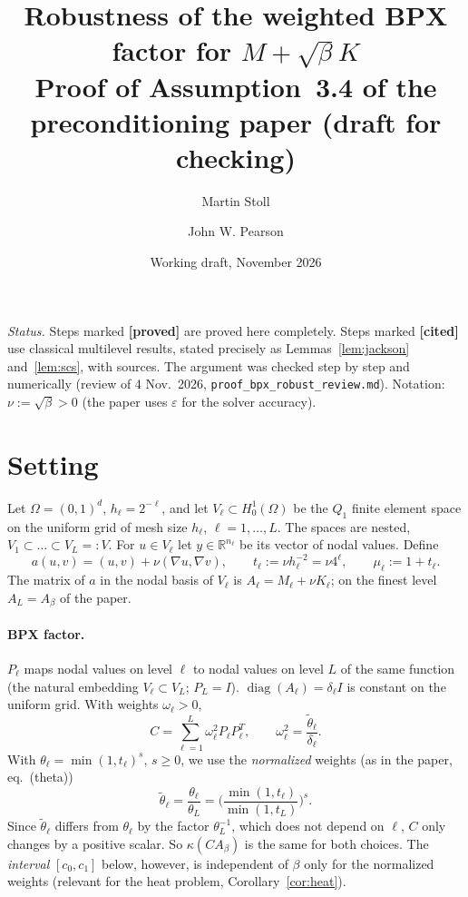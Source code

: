 \documentclass[11pt,a4paper]{article}
\title{Robustness of the weighted BPX factor for $M+\sqrt\beta K$\\[2pt]
\large Proof of Assumption~3.4 of the preconditioning paper (draft for checking)}
\author{Martin Stoll \and John W. Pearson}
\date{Working draft, November 2026}
\theoremstyle{remark}
\newcommand{\R}{\mathbb{R}}
\begin{document}
\maketitle

\noindent\emph{Status.} Steps marked \textbf{[proved]} are proved here
completely. Steps marked \textbf{[cited]} use classical multilevel results,
stated precisely as Lemmas~\ref{lem:jackson} and~\ref{lem:scs}, with sources.
The argument was checked step by step and numerically (review of 4 Nov.\ 2026,
\texttt{proof\_bpx\_robust\_review.md}). Notation: $\nu:=\sqrt\beta>0$
(the paper uses $\varepsilon$ for the solver accuracy).

\section{Setting}

Let $\Omega=(0,1)^d$, $h_\ell=2^{-\ell}$, and let $V_\ell\subset H^1_0(\Omega)$ be the $Q_1$
finite element space on the uniform grid of mesh size $h_\ell$, $\ell=1,\dots,L$. The
spaces are nested, $V_1\subset\dots\subset V_L=:V$. For $u\in V_\ell$ let $y\in\R^{n_\ell}$ be its
vector of nodal values. Define
\[
a(u,v)=(u,v)+\nu(\nabla u,\nabla v),\qquad t_\ell:=\nu h_\ell^{-2}=\nu4^\ell,\qquad \mu_\ell:=1+t_\ell .
\]
The matrix of $a$ in the nodal basis of $V_\ell$ is $A_\ell=M_\ell+\nu K_\ell$; on the finest
level $A_L=A_\beta$ of the paper.

\paragraph{BPX factor.} $P_\ell$ maps nodal values on level $\ell$ to nodal values on
level $L$ of the same function (the natural embedding $V_\ell\subset V_L$; $P_L=I$).
$\operatorname{diag}(A_\ell)=\delta_\ell I$ is constant on the uniform grid. With weights $\omega_\ell>0$,
\[
C=\sum_{\ell=1}^L\omega_\ell^2P_\ell P_\ell^T,\qquad \omega_\ell^2=\frac{\tilde\theta_\ell}{\delta_\ell}.
\]
With $\theta_\ell=\min(1,t_\ell)^s$, $s\ge0$, we use the \emph{normalized} weights
(as in the paper, eq.~(theta))
\[
\tilde\theta_\ell=\frac{\theta_\ell}{\theta_L}=\Big(\frac{\min(1,t_\ell)}{\min(1,t_L)}\Big)^s .
\]
Since $\tilde\theta_\ell$ differs from $\theta_\ell$ by the factor $\theta_L^{-1}$, which does not depend on
$\ell$, $C$ only changes by a positive scalar. So $\kappa(CA_\beta)$ is the same for
both choices. The \emph{interval} $[c_0,c_1]$ below, however, is independent of
$\beta$ only for the normalized weights (relevant for the heat problem,
Corollary~\ref{cor:heat}).
\end{document}

